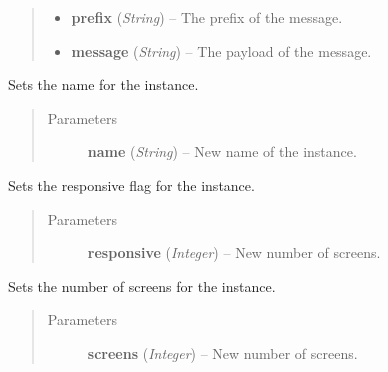 \documentclass[letterpaper,10pt,english]{sphinxmanual}
\begin{document}
\begin{fulllineitems}
\begin{fulllineitems}
\begin{quote}
\begin{description}
\begin{itemize}
\item {} 
\textbf{prefix} (\emph{String}) -- The prefix of the message.

\item {} 
\textbf{message} (\emph{String}) -- The payload of the message.

\end{itemize}

\end{description}\end{quote}

\end{fulllineitems}


\begin{fulllineitems}
\label{swnp:swnp.SWNP.set_name}
Sets the name for the instance.
\begin{quote}\begin{description}
\item[{Parameters}] \leavevmode
\textbf{name} (\emph{String}) -- New name of the instance.

\end{description}\end{quote}

\end{fulllineitems}


\begin{fulllineitems}
\label{swnp:swnp.SWNP.set_responsive}
Sets the responsive flag for the instance.
\begin{quote}\begin{description}
\item[{Parameters}] \leavevmode
\textbf{responsive} (\emph{Integer}) -- New number of screens.

\end{description}\end{quote}

\end{fulllineitems}


\begin{fulllineitems}
\label{swnp:swnp.SWNP.set_screens}
Sets the number of screens for the instance.
\begin{quote}\begin{description}
\item[{Parameters}] \leavevmode
\textbf{screens} (\emph{Integer}) -- New number of screens.


\end{description}
\end{quote}
\end{fulllineitems}
\end{fulllineitems}
\end{document}
